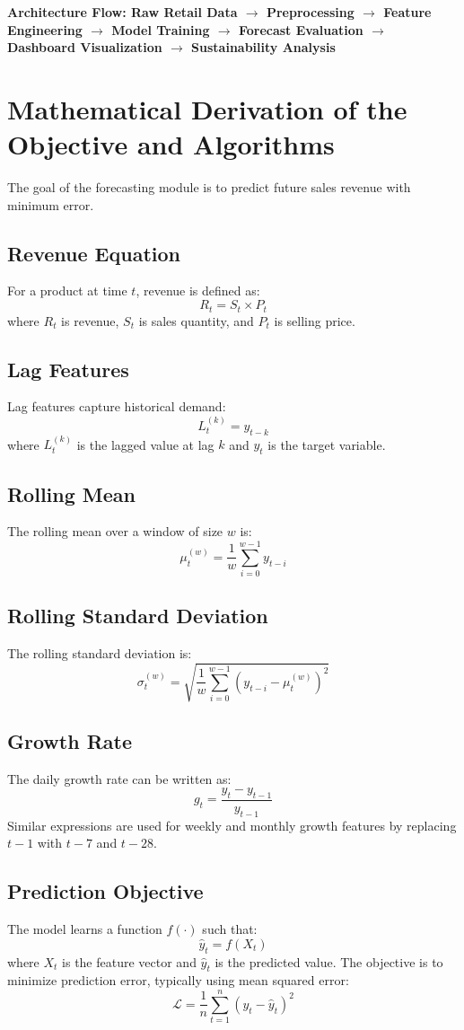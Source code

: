 \documentclass[12pt,a4paper]{article}
\newcommand{\highlightbox}[3]{
\begin{tcolorbox}[
    enhanced,
    colback=#1,
    colframe=#2,
    boxrule=0.8pt,
    arc=3pt,
    left=8pt,
    right=8pt,
    top=8pt,
    bottom=8pt
]
\textbf{#3}
\end{tcolorbox}
}
\begin{document}
\highlightbox{SoftBlue}{PrimaryBlue}{Architecture Flow: Raw Retail Data $\rightarrow$ Preprocessing $\rightarrow$ Feature Engineering $\rightarrow$ Model Training $\rightarrow$ Forecast Evaluation $\rightarrow$ Dashboard Visualization $\rightarrow$ Sustainability Analysis}

\section{Mathematical Derivation of the Objective and Algorithms}
The goal of the forecasting module is to predict future sales revenue with minimum error.

\subsection{Revenue Equation}
For a product at time $t$, revenue is defined as:
\[
R_t = S_t \times P_t
\]
where $R_t$ is revenue, $S_t$ is sales quantity, and $P_t$ is selling price.

\subsection{Lag Features}
Lag features capture historical demand:
\[
L_t^{(k)} = y_{t-k}
\]
where $L_t^{(k)}$ is the lagged value at lag $k$ and $y_t$ is the target variable.

\subsection{Rolling Mean}
The rolling mean over a window of size $w$ is:
\[
\mu_t^{(w)} = \frac{1}{w}\sum_{i=0}^{w-1} y_{t-i}
\]

\subsection{Rolling Standard Deviation}
The rolling standard deviation is:
\[
\sigma_t^{(w)} = \sqrt{\frac{1}{w}\sum_{i=0}^{w-1}\left(y_{t-i} - \mu_t^{(w)}\right)^2}
\]

\subsection{Growth Rate}
The daily growth rate can be written as:
\[
g_t = \frac{y_t - y_{t-1}}{y_{t-1}}
\]
Similar expressions are used for weekly and monthly growth features by replacing $t-1$ with $t-7$ and $t-28$.

\subsection{Prediction Objective}
The model learns a function $f(\cdot)$ such that:
\[
\hat{y}_t = f(X_t)
\]
where $X_t$ is the feature vector and $\hat{y}_t$ is the predicted value. The objective is to minimize prediction error, typically using mean squared error:
\[
\mathcal{L} = \frac{1}{n}\sum_{t=1}^{n}(y_t - \hat{y}_t)^2
\]
\end{document}
